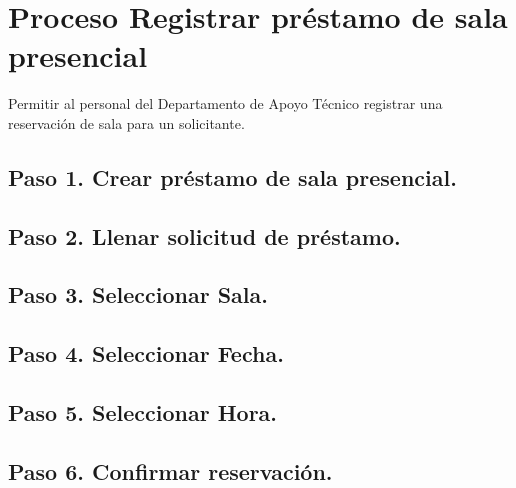 \chapter{Proceso Registrar préstamo de sala presencial}
	Permitir al personal del Departamento de Apoyo Técnico registrar una 
	reservación de sala para un solicitante.


\section{Paso 1. Crear préstamo de sala presencial.}
	
\section{Paso 2. Llenar solicitud de préstamo.}
	
\section{Paso 3. Seleccionar Sala.}
	
\section{Paso 4. Seleccionar Fecha.}

\section{Paso 5. Seleccionar Hora.}

\section{Paso 6. Confirmar reservación.}


